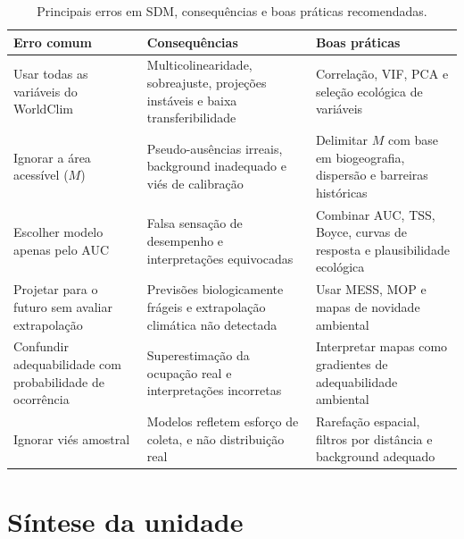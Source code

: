 \begin{table}[H]
	\centering
	\caption{Principais erros em SDM, consequências e boas práticas recomendadas.}
	\label{tab:erros_comuns_sdm}
	
	\scriptsize
	
	\begin{tabular}{
			p{}
			p{}
			p{}
		}
		
		\toprule
		\textbf{Erro comum} &
		\textbf{Consequências} &
		\textbf{Boas práticas} \\
		\midrule
		
		Usar todas as variáveis do WorldClim &
		Multicolinearidade, sobreajuste, projeções instáveis e baixa transferibilidade &
		Correlação, VIF, PCA e seleção ecológica de variáveis \\
		
		Ignorar a área acessível ($M$) &
		Pseudo-ausências irreais, background inadequado e viés de calibração &
		Delimitar $M$ com base em biogeografia, dispersão e barreiras históricas \\
		
		Escolher modelo apenas pelo AUC &
		Falsa sensação de desempenho e interpretações equivocadas &
		Combinar AUC, TSS, Boyce, curvas de resposta e plausibilidade ecológica \\
		
		Projetar para o futuro sem avaliar extrapolação &
		Previsões biologicamente frágeis e extrapolação climática não detectada &
		Usar MESS, MOP e mapas de novidade ambiental \\
		
		Confundir adequabilidade com probabilidade de ocorrência &
		Superestimação da ocupação real e interpretações incorretas &
		Interpretar mapas como gradientes de adequabilidade ambiental \\
		
		Ignorar viés amostral &
		Modelos refletem esforço de coleta, e não distribuição real &
		Rarefação espacial, filtros por distância e background adequado \\
		
		\bottomrule
	\end{tabular}
	
\end{table}

\section{Síntese da unidade}

